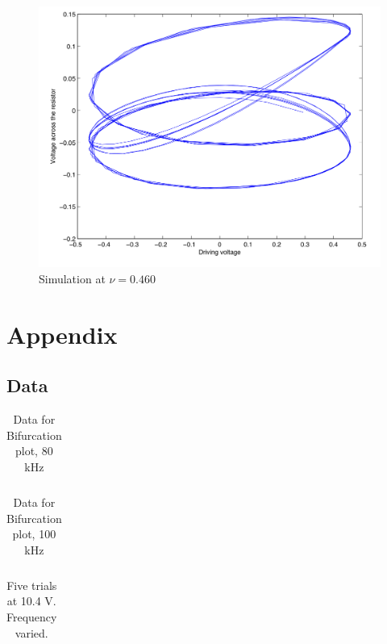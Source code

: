 \documentclass[12pt]{report}
\begin{document}
	\begin{figure}
		\centering
		\includegraphics{simulations/plotnu0460.png}
		\caption{Simulation at $\nu=0.460$}
		\label{fig:sim.0460}
	\end{figure}



\chapter*{Appendix}

\section{Data}
\label{sec:Data}

	\begin{table}[h]
		\centering
		\begin{tabular}{|l|l|l||l|l|l|}
			\hline
			 
		\end{tabular}
		\caption{Data for Bifurcation plot, 80 kHz}
		\label{tab:80khz}
	\end{table}

	\begin{table}[h]
		\centering
		\begin{tabular}{|l|l|l|l||l|l|l|l|}
			\hline
			 
		\end{tabular}
		\caption{Data for Bifurcation plot, 100 kHz}
		\label{tab:100khz}
	\end{table}

	\begin{table}[h]
		\centering
		\begin{tabular}{|c|c|c|c|c|}
			\hline
			 
		\end{tabular}
		\caption{Five trials at 10.4 V. Frequency varied.}
		\label{tab:chaos3}
	\end{table}
\end{document}
